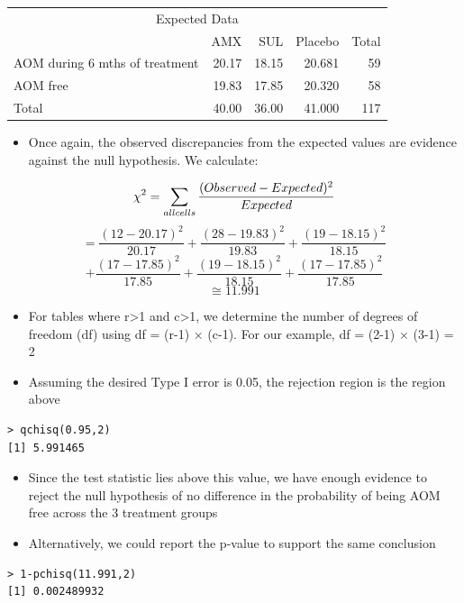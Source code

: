 \documentclass[
]{book}
\providecommand{\tightlist}{%
  \setlength{\itemsep}{0pt}\setlength{\parskip}{0pt}}
\begin{document}
\begin{table}
\centering
\begin{tabular}{l|r|r|r|r}
\hline
\multicolumn{5}{c}{Expected Data} \\
\cline{1-5}
  & AMX & SUL & Placebo & Total\\
\hline
AOM during 6 mths of treatment & 20.17 & 18.15 & 20.681 & 59\\
\hline
AOM free & 19.83 & 17.85 & 20.320 & 58\\
\hline
Total & 40.00 & 36.00 & 41.000 & 117\\
\hline
\end{tabular}
\end{table}

\begin{itemize}
\tightlist
\item
  Once again, the observed discrepancies from the expected values are evidence against the null hypothesis. We calculate:
\end{itemize}

\[\chi^2=\sum_{all\space cells}\frac{(Observed-Expected)^2}{Expected}\]
\[=\frac{(12-20.17)^2}{20.17}+\frac{(28-19.83)^2}{19.83}+\frac{(19-18.15)^2}{18.15}\]
\[+\frac{(17-17.85)^2}{17.85}+\frac{(19-18.15)^2}{18.15}+\frac{(17-17.85)^2}{17.85}\]
\[\cong11.991\]

\begin{itemize}
\tightlist
\item
  For tables where r\textgreater1 and c\textgreater1, we determine the number of degrees of freedom (df) using df = (r-1) × (c-1). For our example, df = (2-1) × (3-1) = 2
\item
  Assuming the desired Type I error is 0.05, the rejection region is the region above
\end{itemize}

\begin{verbatim}
> qchisq(0.95,2)
[1] 5.991465
\end{verbatim}

\begin{itemize}
\tightlist
\item
  Since the test statistic lies above this value, we have enough evidence to reject the null hypothesis of no difference in the probability of being AOM free across the 3 treatment groups
\item
  Alternatively, we could report the p-value to support the same conclusion
\end{itemize}

\begin{verbatim}
> 1-pchisq(11.991,2)
[1] 0.002489932 
\end{verbatim}
\end{document}

